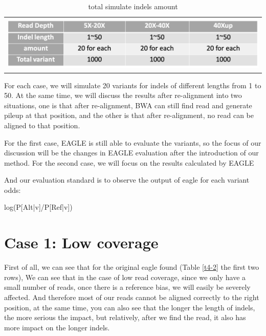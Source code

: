 \vspace{0.5cm}
\begin{table}[h]
    \centering
    \caption[total indels amount]{total simulate indels amount}
    \vspace{-0.5cm}
    \begin{tabular}{c}
        \includegraphics[width=1\textwidth]{body/image/t4-1.png}
    \end{tabular}
    \label{t4-1}
\end{table}

For each case, we will simulate 20 variants for indels of different lengths from 1 to 50. At the same time, we will discuss the results after re-alignment into two situations, one is that after re-alignment, BWA can still find read and generate pileup at that position, and the other is that after re-alignment, no read can be aligned to that position.

For the first case, EAGLE is still able to evaluate the variants, so the focus of our discussion will be the changes in EAGLE evaluation after the introduction of our method. For the second case, we will focus on the results calculated by EAGLE
\begin{flushleft}
And our evaluation standard is to observe the output of eagle for each variant odds:  
\end{flushleft}
\begin{center}
    log⁡(P[Alt|v]/P[Ref|v])
\end{center}

\section{Case 1: Low coverage}

First of all, we can see that for the original eagle found (Table \ref{t4-2} the first two rows), We can see that in the case of low read coverage, since we only have a small number of reads, once there is a reference bias, we will easily be severely affected. And therefore most of our reads cannot be aligned correctly to the right position, at the same time, you can also see that the longer the length of indels, the more serious the impact, but relatively, after we find the read, it also has more impact on the longer indels.

